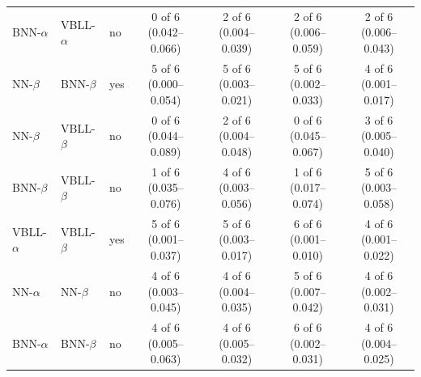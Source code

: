 \begin{landscape}
{\begin{longtable}{lllcccc}
BNN-$\alpha$ & VBLL-$\alpha$ & no & 0 of 6 (0.042--0.066) & 2 of 6 (0.004--0.039) & 2 of 6 (0.006--0.059) & 2 of 6 (0.006--0.043) \\
NN-$\beta$ & BNN-$\beta$ & yes & 5 of 6 (0.000--0.054) & 5 of 6 (0.003--0.021) & 5 of 6 (0.002--0.033) & 4 of 6 (0.001--0.017) \\
NN-$\beta$ & VBLL-$\beta$ & no & 0 of 6 (0.044--0.089) & 2 of 6 (0.004--0.048) & 0 of 6 (0.045--0.067) & 3 of 6 (0.005--0.040) \\
BNN-$\beta$ & VBLL-$\beta$ & no & 1 of 6 (0.035--0.076) & 4 of 6 (0.003--0.056) & 1 of 6 (0.017--0.074) & 5 of 6 (0.003--0.058) \\
VBLL-$\alpha$ & VBLL-$\beta$ & yes & 5 of 6 (0.001--0.037) & 5 of 6 (0.003--0.017) & 6 of 6 (0.001--0.010) & 4 of 6 (0.001--0.022) \\
NN-$\alpha$ & NN-$\beta$ & no & 4 of 6 (0.003--0.045) & 4 of 6 (0.004--0.035) & 5 of 6 (0.007--0.042) & 4 of 6 (0.002--0.031) \\
BNN-$\alpha$ & BNN-$\beta$ & no & 4 of 6 (0.005--0.063) & 4 of 6 (0.005--0.032) & 6 of 6 (0.002--0.031) & 4 of 6 (0.004--0.025) \\
\bottomrule
\end{longtable}}


\end{landscape}
